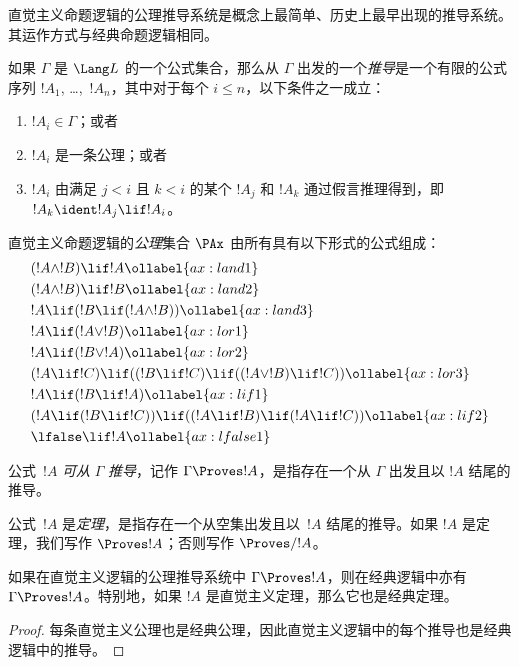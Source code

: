\documentclass[../../../include/open-logic-section]{subfiles}
\begin{document}


直觉主义命题逻辑的公理推导系统是概念上最简单、历史上最早出现的推导系统。其运作方式与经典命题逻辑相同。

\begin{defn}[可推导性]
如果 $\Gamma$ 是 $\Lang L$ 的一个公式集合，那么从 $\Gamma$ 出发的一个\emph{推导}是一个有限的公式序列 $!A_1$, \dots,~$!A_n$，其中对于每个 $i \le n$，以下条件之一成立：
\begin{enumerate}
\item $!A_i \in \Gamma$；或者
\item $!A_i$ 是一条公理；或者
\item $!A_i$ 由满足 $j < i$ 且 $k < i$ 的某个 $!A_j$ 和 $!A_k$ 通过假言推理得到，即 $!A_k \ident !A_j \lif !A_i$。
\end{enumerate}
\end{defn}

\begin{defn}[公理]
直觉主义命题逻辑的\emph{公理}集合 $\PAx$ 由所有具有以下形式的公式组成：
\begin{align}
  & (!A \land !B) \lif !A \ollabel{ax:land1}\\
  & (!A \land !B) \lif !B \ollabel{ax:land2}\\
  & !A \lif (!B \lif (!A \land !B)) \ollabel{ax:land3}\\
  & !A \lif (!A \lor !B) \ollabel{ax:lor1}\\
  & !A \lif (!B \lor !A) \ollabel{ax:lor2}\\
  & (!A \lif !C) \lif ((!B \lif !C) \lif ((!A \lor !B) \lif !C)) \ollabel{ax:lor3}\\
  & !A \lif (!B \lif !A) \ollabel{ax:lif1}\\
  & (!A \lif (!B \lif !C)) \lif ((!A \lif !B) \lif (!A \lif !C)) \ollabel{ax:lif2}\\
  & \lfalse \lif !A \ollabel{ax:lfalse1}
\end{align}
\end{defn}

\begin{defn}[可推导性]
公式~$!A$ \emph{可从} $\Gamma$ \emph{推导}，记作 $\Gamma \Proves !A$，是指存在一个从 $\Gamma$ 出发且以 $!A$ 结尾的推导。
\end{defn}

\begin{defn}[定理]
公式~$!A$ 是\emph{定理}，是指存在一个从空集出发且以~$!A$ 结尾的推导。如果 $!A$ 是定理，我们写作 $\Proves !A$；否则写作 $\Proves/ !A$。
\end{defn}

\begin{prop}
  如果在直觉主义逻辑的公理推导系统中 $\Gamma \Proves !A$，则在经典逻辑中亦有 $\Gamma \Proves !A$。特别地，如果 $!A$ 是直觉主义定理，那么它也是经典定理。
\end{prop}

\begin{proof}
  每条直觉主义公理也是经典公理，因此直觉主义逻辑中的每个推导也是经典逻辑中的推导。
\end{proof}
\end{document}
